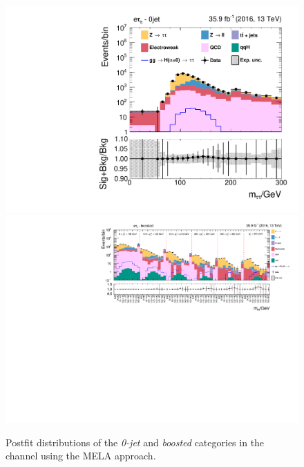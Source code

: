 \begin{figure}[h!]
    \centering
        \includegraphics[width=.5\textwidth]{Figures/statana/Postfit_JEC_mela3D/postfit_fit_s_htt_et_1_13TeV.pdf}\\
        \includegraphics[width=\textwidth]{Figures/statana/Postfit_JEC_mela3D/postfit_fit_s_htt_et_2_13TeV.pdf}
    \caption{Postfit distributions of the \textit{0-jet} and \textit{boosted} categories in the \etau{} channel  using the MELA approach.}
\end{figure} 
